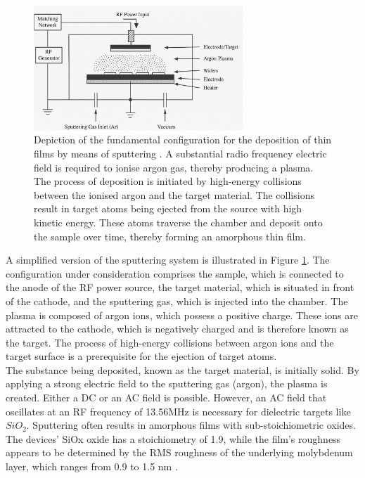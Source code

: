\begin{figure}[htbp!] 
    \centering    
    \includegraphics[width=0.7\textwidth]{Chapter3/Figs/b.png}
    \caption[Radio Frequency Magnetron Sputtering]{Depiction of the fundamental configuration for the deposition of thin films by means of sputtering \cite{jeong2008origin}. A substantial radio frequency electric field is required to ionise argon gas, thereby producing a plasma. The process of deposition is initiated by high-energy collisions between the ionised argon and the target material. The collisions result in target atoms being ejected from the source with high kinetic energy. These atoms traverse the chamber and deposit onto the sample over time, thereby forming an amorphous thin film.}
    \label{fig:3b}
\end{figure}

\noindent A simplified version of the sputtering system is illustrated in Figure \ref{fig:3b}. The configuration under consideration comprises the sample, which is connected to the anode of the RF power source, the target material, which is situated in front of the cathode, and the sputtering gas, which is injected into the chamber. The plasma is composed of argon ions, which possess a positive charge. These ions are attracted to the cathode, which is negatively charged and is therefore known as the target. The process of high-energy collisions between argon ions and the target surface is a prerequisite for the ejection of target atoms.\\

\noindent  The substance being deposited, known as the target material, is initially solid. By applying a strong electric field to the sputtering gas (argon), the plasma is created. Either a DC or an AC field is possible. However, an AC field that oscillates at an RF frequency of 13.56MHz is necessary for dielectric targets like $SiO_2$. Sputtering often results in amorphous films with sub-stoichiometric oxides. The devices' SiOx oxide has a stoichiometry of 1.9, while the film's roughness appears to be determined by the RMS roughness of the underlying molybdenum layer, which ranges from 0.9 to 1.5 nm \cite{kenyon2019interplay}. \\


